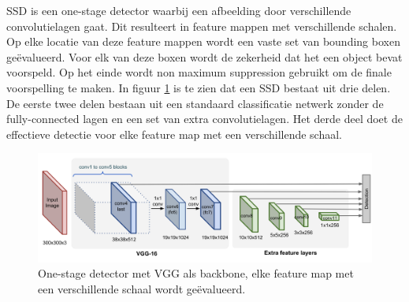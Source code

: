 SSD \cite{liu_ssd_2016} is een one-stage detector waarbij een afbeelding door verschillende convolutielagen gaat.
Dit resulteert in feature mappen met verschillende schalen.
Op elke locatie van deze feature mappen wordt een vaste set van bounding boxen ge\"evalueerd.
Voor elk van deze boxen wordt de zekerheid dat het een object bevat voorspeld.
Op het einde wordt non maximum suppression gebruikt om de finale voorspelling te maken.
In figuur \ref{fig:ssd} is te zien dat een SSD bestaat uit drie delen.
De eerste twee delen bestaan uit een standaard classificatie netwerk zonder de fully-connected lagen en een set van extra convolutielagen.
Het derde deel doet de effectieve detectie voor elke feature map met een verschillende schaal. 

\begin{figure}[!ht]
	\centering
	\includegraphics[width=0.80\linewidth]{fig/SSD.png}
	\caption{One-stage detector met VGG als backbone, elke feature map met een verschillende schaal wordt ge\"evalueerd.}
	\label{fig:ssd}
\end{figure}

